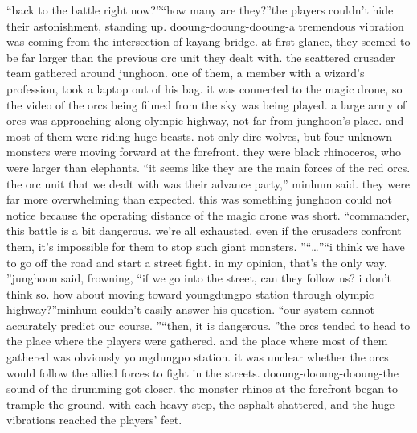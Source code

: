 “back to the battle right now?”“how many are they?”the players couldn’t hide their astonishment, standing up.
dooung-dooung-dooung-a tremendous vibration was coming from the intersection of kayang bridge.
 at first glance, they seemed to be far larger than the previous orc unit they dealt with.
the scattered crusader team gathered around junghoon.
 one of them, a member with a wizard’s profession, took a laptop out of his bag.
 it was connected to the magic drone, so the video of the orcs being filmed from the sky was being played.
a large army of orcs was approaching along olympic highway, not far from junghoon’s place.
 and most of them were riding huge beasts.
not only dire wolves, but four unknown monsters were moving forward at the forefront.
they were black rhinoceros, who were larger than elephants.
“it seems like they are the main forces of the red orcs.
 the orc unit that we dealt with was their advance party,” minhum said.
they were far more overwhelming than expected.
 this was something junghoon could not notice because the operating distance of the magic drone was short.
“commander, this battle is a bit dangerous.
 we’re all exhausted.
 even if the crusaders confront them, it’s impossible for them to stop such giant monsters.
”“…”“i think we have to go off the road and start a street fight.
 in my opinion, that’s the only way.
”junghoon said, frowning, “if we go into the street, can they follow us? i don’t think so.
 how about moving toward youngdungpo station through olympic highway?”minhum couldn’t easily answer his question.
“our system cannot accurately predict our course.
”“then, it is dangerous.
”the orcs tended to head to the place where the players were gathered.
 and the place where most of them gathered was obviously youngdungpo station.
it was unclear whether the orcs would follow the allied forces to fight in the streets.
dooung-dooung-dooung-the sound of the drumming got closer.
 the monster rhinos at the forefront began to trample the ground.
 with each heavy step, the asphalt shattered, and the huge vibrations reached the players’ feet.


 